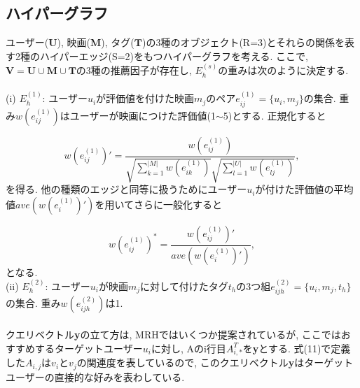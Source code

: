 \documentclass[a4j,11pt]{jarticle}           %
\begin{document}
	\subsection{ハイパーグラフ}
	ユーザー($\textbf{U}$), 映画($\textbf{M}$), タグ($\textbf{T}$)の3種のオブジェクト(R=3)とそれらの関係を表す2種のハイパーエッジ(S=2)をもつハイパーグラフを考える. ここで, $\textbf{V}=\textbf{U}\cup\textbf{M}\cup\textbf{T}$の3種の推薦因子が存在し, $E_h^{(s)}$の重みは次のように決定する. 
	\\\\(i) $E_h^{(1)}$: ユーザー$u_i$が評価値を付けた映画$m_j$のペア$e^{(1)}_{ij}=\{u_i,m_j\}$の集合. 重み$w(e_{ij}^{(1)})$はユーザーが映画につけた評価値(1$\sim$5)とする. 正規化すると
	
	\begin{equation}
		w(e_{ij}^{(1)})'=\frac{w(e_{ij}^{(1)})}{\sqrt{\sum_{k=1}^{|M|}w(e_{ik}^{(1)})}\sqrt{\sum_{l=1}^{|U|}w(e_{lj}^{(1)})}},
	\end{equation}
	を得る. 他の種類のエッジと同等に扱うためにユーザー$u_i$が付けた評価値の平均値$ave(w(e_i^{(1)})')$を用いてさらに一般化すると
	
	\begin{equation}
		w(e_{ij}^{(1)})^*=\frac{w(e_{ij}^{(1)})'}{ave(w(e_i^{(1)})')},
	\end{equation}
	となる. 
	\\(ii) $E_h^{(2)}$: ユーザー$u_i$が映画$m_j$に対して付けたタグ$t_h$の3つ組$e^{(2)}_{ijh}=\{u_i,m_j,t_h\}$の集合. 重み$w(e_{ijh}^{(2)})$は1. 
	\\\\クエリベクトル\textbf{y}の立て方は, MRH\cite{MRH}ではいくつか提案されているが, ここではおすすめするターゲットユーザー$u_i$に対し, Aのi行目$A_{i,*}^T$を\textbf{y}とする. 式(11)で定義した$A_{i, j}$は$v_i$と$v_j$の関連度を表しているので, このクエリベクトル\textbf{y}はターゲットユーザーの直接的な好みを表わしている.
\end{document}
